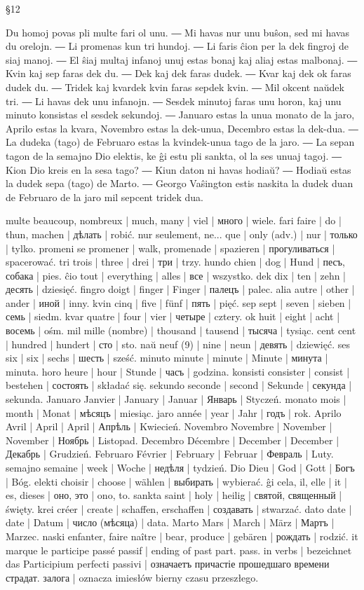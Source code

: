 §12

Du homoj povas pli multe fari ol unu. ― Mi havas nur unu buŝon, sed mi havas du orelojn. ― Li promenas kun tri hundoj. ― Li faris ĉion per la dek fingroj de siaj manoj. ― El ŝiaj multaj infanoj unuj estas bonaj kaj aliaj estas malbonaj. ― Kvin kaj sep faras dek du. ― Dek kaj dek faras dudek. ― Kvar kaj dek ok faras dudek du. ― Tridek kaj kvardek kvin faras sepdek kvin. ― Mil okcent naŭdek tri. ― Li havas dek unu infanojn. ― Sesdek minutoj faras unu horon, kaj unu minuto konsistas el sesdek sekundoj. ― Januaro estas la unua monato de la jaro, Aprilo estas la kvara, Novembro estas la dek-unua, Decembro estas la dek-dua. ― La dudeka (tago) de Februaro estas la kvindek-unua tago de la jaro. ― La sepan tagon de la semajno Dio elektis, ke ĝi estu pli sankta, ol la ses unuaj tagoj. ― Kion Dio kreis en la sesa tago? ― Kiun daton ni havas hodiaŭ? ― Hodiaŭ estas la dudek sepa (tago) de Marto. ― Georgo Vaŝington estis naskita la dudek duan de Februaro de la jaro mil sepcent tridek dua.

multe beaucoup, nombreux | much, many | viel | много | wiele.
fari faire | do | thun, machen | дѣлать | robić.
nur seulement, ne... que | only (adv.) | nur | только | tylko.
promeni se promener | walk, promenade | spazieren | прогуливаться | spacerować.
tri trois | three | drei | три | trzy.
hundo chien | dog | Hund | песъ, собака | pies.
ĉio tout | everything | alles | все | wszystko.
dek dix | ten | zehn | десять | dziesięć.
fingro doigt | finger | Finger | палецъ | palec.
alia autre | other | ander | иной | inny.
kvin cinq | five | fünf | пять | pięć.
sep sept | seven | sieben | семь | siedm.
kvar quatre | four | vier | четыре | cztery.
ok huit | eight | acht | восемь | ośm.
mil mille (nombre) | thousand | tausend | тысяча | tysiąc.
cent cent | hundred | hundert | сто | sto.
naŭ neuf (9) | nine | neun | девять | dziewięć.
ses six | six | sechs | шесть | sześć.
minuto minute | minute | Minute | минута | minuta.
horo heure | hour | Stunde | часъ | godzina.
konsisti consister | consist | bestehen | состоять | składać się.
sekundo seconde | second | Sekunde | секунда | sekunda.
Januaro Janvier | January | Januar | Январь | Styczeń.
monato mois | month | Monat | мѣсяцъ | miesiąc.
jaro année | year | Jahr | годъ | rok.
Aprilo Avril | April | April | Апрѣль | Kwiecień.
Novembro Novembre | November | November | Ноябрь | Listopad.
Decembro Décembre | December | December | Декабрь | Grudzień.
Februaro Février | February | Februar | Февраль | Luty.
semajno semaine | week | Woche | недѣля | tydzień.
Dio Dieu | God | Gott | Богъ | Bóg.
elekti choisir | choose | wählen | выбирать | wybierać.
ĝi cela, il, elle | it | es, dieses | оно, это | ono, to.
sankta saint | holy | heilig | святой, священный | święty.
krei créer | create | schaffen, erschaffen | создавать | stwarzać.
dato date | date | Datum | число (мѣсяца) | data.
Marto Mars | March | März | Мартъ | Marzec.
naski enfanter, faire naître | bear, produce | gebären | рождать | rodzić.
it marque le participe passé passif | ending of past part. pass. in verbs | bezeichnet das Participium perfecti passivi | означаетъ причастіе прошедшаго времени страдат. залога | oznacza imiesłów bierny czasu przeszłego.

